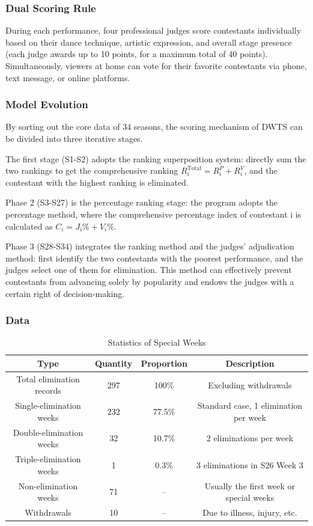 \documentclass{mcmthesis}
\begin{document}
\subsubsection{Dual Scoring Rule}

During each performance, four professional judges score contestants individually based on their dance technique, artistic expression, and overall stage presence (each judge awards up to 10 points, for a maximum total of 40 points). Simultaneously, viewers at home can vote for their favorite contestants via phone, text message, or online platforms.


\subsubsection{Model Evolution}
By sorting out the core data of 34 seasons, the scoring mechanism of DWTS can be divided into three iterative stages. 

The first stage (S1-S2) adopts the ranking superposition system: directly sum the two rankings to get the comprehensive ranking $R_i^{\text{Total}}=R_i^P+R_i^V$, and the contestant with the highest ranking is eliminated.

Phase 2 (S3-S27) is the percentage ranking stage: the program adopts the percentage method, where the comprehensive percentage index of contestant i is calculated as $C_i=J_i\%+V_i\%$.

Phase 3 (S28-S34) integrates the ranking method and the judges' adjudication method: first identify the two contestants with the poorest performance, and the judges select one of them for elimination. This method can effectively prevent contestants from advancing solely by popularity and endows the judges with a certain right of decision-making.

\subsubsection{Data}
\begin{table}[H]
\centering
\caption{Statistics of Special Weeks}
\begin{tabular}{c|c|c|c}
\hline
Type & Quantity & Proportion & Description \\
\hline
Total elimination records & 297 & 100\% & Excluding withdrawals \\
Single-elimination weeks & 232 & 77.5\% & Standard case, 1 elimination per week \\
Double-elimination weeks & 32 & 10.7\% & 2 eliminations per week \\
Triple-elimination weeks & 1 & 0.3\% & 3 eliminations in S26 Week 3 \\
Non-elimination weeks & 71 & -- & Usually the first week or special weeks \\
Withdrawals & 10 & -- & Due to illness, injury, etc. \\
\hline
\end{tabular}
\end{table}
\end{document}
